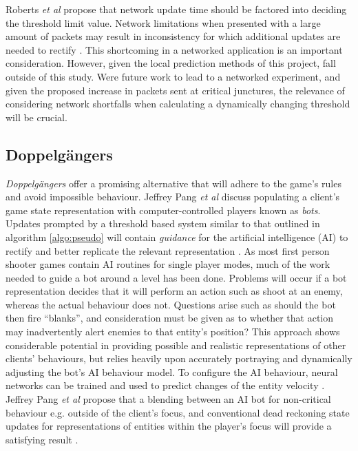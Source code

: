 \documentclass[journal]{IEEEtran}
\begin{document}
Roberts \textit{et al} propose that network update time should be factored into deciding the threshold limit value. Network limitations when presented with a large amount of packets may result in inconsistency for which additional updates are needed to rectify \cite{roberts2008bounding}. This shortcoming in a networked application is an important consideration. However, given the local prediction methods of this project, fall outside of this study. Were future work to lead to a networked experiment, and given the proposed increase in packets sent at critical junctures, the relevance of considering network shortfalls when calculating a dynamically changing threshold will be crucial.

\subsection{Doppelg\"{a}ngers}

\textit{Doppelg\"{a}ngers} offer a promising alternative that will adhere to the game's rules and avoid impossible behaviour. Jeffrey Pang \textit{et al} discuss populating a client's game state representation with computer-controlled players known as \textit{bots}. Updates prompted by a threshold based system similar to that outlined in algorithm \ref{algo:pseudo} will contain \textit{guidance} for the artificial intelligence (AI) to rectify and better replicate the relevant representation \cite{pang2007scaling} \cite{bharambe2008donnybrook}. As most first person shooter games contain AI routines for single player modes, much of the work needed to guide a bot around a level has been done. Problems will occur if a bot representation decides that it will perform an action such as shoot at an enemy, whereas the actual behaviour does not. Questions arise such as should the bot then fire ``blanks'', and consideration must be given as to whether that action may inadvertently alert enemies to that entity's position? This approach shows considerable potential in providing possible and realistic representations of other clients' behaviours, but relies heavily upon accurately portraying and dynamically adjusting the bot's AI behaviour model. To configure the AI behaviour, neural networks can be trained and used to predict changes of the entity velocity \cite{mccoy2007multistep}. Jeffrey Pang \textit{et al} propose that a blending between an AI bot for non-critical behaviour e.g. outside of the client's focus, and conventional dead reckoning state updates for representations of entities within the player's focus will provide a satisfying result \cite{pang2007scaling}.
\end{document}
